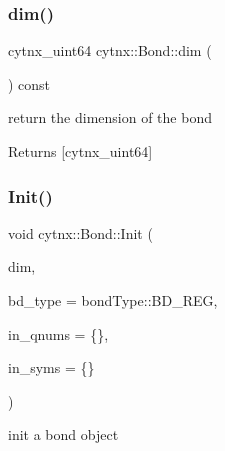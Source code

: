 \subsubsection{\texorpdfstring{dim()}{dim()}}
{\footnotesize\ttfamily cytnx\+\_\+uint64 cytnx\+::\+Bond\+::dim (\begin{DoxyParamCaption}{ }\end{DoxyParamCaption}) const\hspace{0.3cm}{\ttfamily [inline]}}



return the dimension of the bond 

\begin{DoxyReturn}{Returns}
\mbox{[}cytnx\+\_\+uint64\mbox{]} 
\end{DoxyReturn}
\mbox{\label{classcytnx_1_1Bond_a707a803fa98fb6a87b5f3c3b3000509f}} 
\subsubsection{\texorpdfstring{Init()}{Init()}}
{\footnotesize\ttfamily void cytnx\+::\+Bond\+::\+Init (\begin{DoxyParamCaption}\item[{const cytnx\+\_\+uint64 \&}]{dim,  }\item[{const bond\+Type \&}]{bd\+\_\+type = {\ttfamily bondType\+:\+:BD\+\_\+REG},  }\item[{const std\+::vector$<$ std\+::vector$<$ cytnx\+\_\+int64 $>$ $>$ \&}]{in\+\_\+qnums = {\ttfamily \{\}},  }\item[{const std\+::vector$<$ \hyperlink{classcytnx_1_1Symmetry}{Symmetry} $>$ \&}]{in\+\_\+syms = {\ttfamily \{\}} }\end{DoxyParamCaption})\hspace{0.3cm}{\ttfamily [inline]}}



init a bond object 



